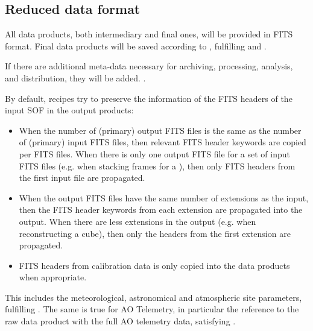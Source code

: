 %



\subsection{Reduced data format}
\label{ssec:reduced_data_format}

All data products, both intermediary and final ones, will be provided in FITS format. Final data products will be saved according to \cite{ESO-products_standard}, fulfilling  and .

If there are additional meta-data necessary for archiving, processing, analysis, and distribution, they will be added. .

By default, recipes try to preserve the information of the FITS headers of the input \ac{SOF} in the output products:
\begin{itemize}
\item When the number of (primary) output FITS files is the same as the number of (primary) input FITS files, then relevant FITS header keywords are copied per FITS files. When there is only one output FITS file for a set of input FITS files (e.g. when stacking frames for a \hyperref[dataitem:master_dark_2rg]{}), then only FITS headers from the first input file are propagated.
\item When the output FITS files have the same number of extensions as  the input, then the FITS header keywords from each extension are propagated into the output. When there are less extensions in the output (e.g. when reconstructing a cube), then only the headers from the first extension are propagated.
\item FITS headers from calibration data is only copied into the data products when appropriate.
\end{itemize}
This includes the meteorological, astronomical and atmospheric site parameters, fulfilling .
The same is true for \ac{AO} Telemetry, in particular the reference to the raw data product with the full \ac{AO} telemetry data, satisfying .

